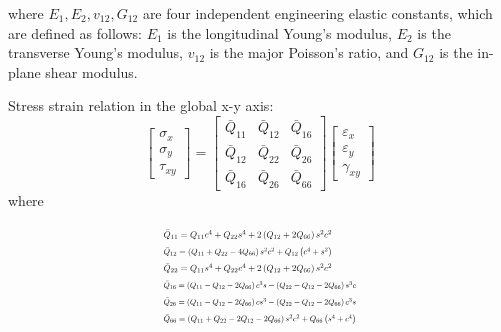 \documentclass[USenglish,twocolumn]{article}
\begin{document}
where $E_1, E_2, v_{12}, G_{12} $ are four independent engineering elastic constants, which are defined as follows: $E_1 $ is the longitudinal Young's modulus, $E_2 $ is the transverse Young's modulus, $v_{12} $ is the major Poisson's ratio, and $G_{12} $ is the in-plane shear modulus.

Stress strain relation in the global x-y axis:
\begin{equation}\left[\begin{array}{l}\sigma _{x} \\ \sigma _{y} \\ \tau_{xy}\end{array}\right]=\left[\begin{array}{lll}\bar{Q}_{11} & \bar{Q}_{12} & \bar{Q}_{16}\\ \bar{Q}_{12} & \bar{Q}_{22} & \bar{Q}_{26} \\ \bar{Q}_{16} & \bar{Q}_{26} &\bar{Q}_{66}\end{array}\right]\left[\begin{array}{l}\varepsilon_{x} \\ \varepsilon_{y}\\ \gamma_{x y}\end{array}\right]
\end{equation}
where

\begin{equation}
	\begin{array}{l}
		\resizebox{.35\textwidth}{!}{$\bar{Q}_{11}=Q_{11} c^{4}+Q_{22} s^{4}+2\left(Q_{12}+2
		Q_{66}\right) s^{2} c^{2}$} \\

		\resizebox{.35\textwidth}{!}{$\bar{Q}_{12}=\left(Q_{11}+Q_{22}-4 Q_{66}\right) s^{2}
		c^{2}+Q_{12}\left(c^{4}+s^{2}\right)$} \\

		\resizebox{.35\textwidth}{!}{$\bar{Q}_{22}=Q_{11} s^{4}+Q_{22} c^{4}+2\left(Q_{12}+2
		Q_{66}\right) s^{2} c^{2}$} \\

		\resizebox{.4\textwidth}{!}{$\bar{Q}_{16}=\left(Q_{11}-Q_{12}-2 Q_{66}\right) c^{3} s-\left(Q_{22}-Q_{12}-2Q_{66}\right) s^{3} c$}
		 \\ 
		\resizebox{.4\textwidth}{!}{$\bar{Q}_{26}=\left(Q_{11}-Q_{12}-2 Q_{66}\right) c s^{3}-\left(Q_{22}-Q_{12}-2 Q_{66}\right)c^{3} s$}
		 \\ 
	\resizebox{.4\textwidth}{!}	{$\bar{Q}_{66}=\left(Q_{11}+Q_{22}-2 Q_{12}-2 Q_{66}\right)
	s^{2}c^{2}+Q_{66}\left(s^{4}+c^{4}\right)$}\\
	\end{array}
\end{equation}
\end{document}
